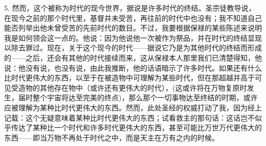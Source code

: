 5. 然而，这个被称为时代的现今世界，据说是许多时代的终结。圣宗徒教导说，在现今之前的那个时代里，基督并未受苦，再往前的时代中也没有；我不知道自己能否列举出他未曾受苦的先前时代的数目。不过，我要根据保禄的某些陈述来说明我是如何领会这一点的。他说：因为他说他一次被作为祭品，并在时代的终结显现以除去罪过。现在，关于这个现今的时代——据说它乃是为其他时代的终结而形成的——之后，还会有其他的时代接续而来，这从保禄本人那里我们已清楚得知，他说：他没有说，也没有说，由此我推断，他的话语暗示了许多时代。如果还有什么比时代更伟大的东西，以至于在被造物中可理解为某些时代，但在那超越并高于可见受造物的其他存在物中（或许还有更伟大的时代），(这或许将在万物复原时发生，届时整个宇宙将达至完美的终点)，那么那个一切事物达至终结的时期，或许应被理解为某种比时代更伟大的东西。然而，此处圣经的权威打动了我，因为经上记载：这个无疑意味着某种比时代更伟大的东西；试看救主的那句话：这话岂不似乎传达了某种比一个时代和许多时代更伟大的东西，甚至可能比万世万代更伟大的东西——即当万物不再处于时代之中，而是天主在万有之内的时候。\par

